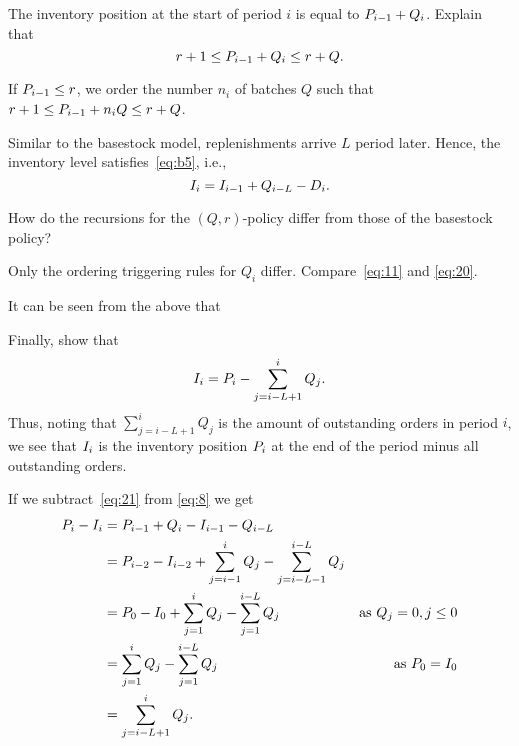 \begin{exercise}
The inventory position at the start of period $i$ is equal to $P_{i-1} + Q_i$.   Explain that 
\begin{equation*}
  r+1 \leq P_{i-1}+Q_i \leq r + Q.
\end{equation*}
\begin{solution}
  If $P_{i-1} \leq r$, we order the number $n_i$ of batches $Q$ such that $r+1\leq P_{i-1} + n_i Q \leq r+Q$. 
\end{solution}
\end{exercise}

Similar to the basestock model, replenishments arrive $L$ period later. Hence, the inventory level satisfies~\eqref{eq:b5}, i.e., 
\begin{equation}\label{eq:1}
  I_{i} = I_{i-1} + Q_{i-L} - D_i.
\end{equation}

\begin{exercise}
How do the recursions for the $(Q,r)$-policy differ from those of the basestock policy?
  \begin{solution} Only the ordering triggering rules for $Q_i$ differ. Compare~\eqref{eq:11} and \eqref{eq:20}.
  \end{solution}
\end{exercise}


It can be seen from the above that

\begin{exercise}
Finally, show that
  \begin{equation}\label{eq:7}
    I_i = P_i - \sum_{j=i-L+1}^i Q_j.
  \end{equation}
Thus, noting that $\sum_{j=i-L+1}^i Q_j$ is the amount of outstanding orders in period $i$, we see that $I_i$ is the inventory position $P_i$ at the end of the period minus all outstanding orders.
\begin{solution}
  If we   subtract~\eqref{eq:21} from \eqref{eq:8} we get 
  \begin{align*}
    P_i - I_i 
&= P_{i-1} + Q_{i} - I_{i-1} - Q_{i-L} \\
&= P_{i-2} - I_{i-2} + \sum_{j=i-1}^i Q_{j} - \sum_{j=i-L-1}^{i-L} Q_{j} \\
&= P_{0} - I_{0} + \sum_{j=1}^i Q_{j} - \sum_{j=1}^{i-L} Q_{j} &\text{as }Q_j=0, j\leq 0\\
&= \sum_{j=1}^i Q_{j} - \sum_{j=1}^{i-L} Q_{j} &\text{as }P_0 = I_0\\
&= \sum_{j=i-L+1}^i Q_{j}.
  \end{align*}
\end{solution}
\end{exercise}



